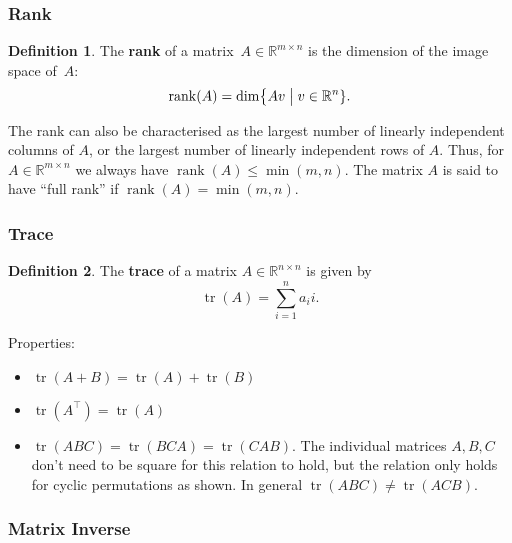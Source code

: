 \documentclass[
  a4paper,
]{article}
\theoremstyle{definition}
\newtheorem{definition}{Definition}[section]
\theoremstyle{definition}
\theoremstyle{definition}
\theoremstyle{definition}
\theoremstyle{remark}
\begin{document}
\hypertarget{rank}{%
\subsubsection{Rank}\label{rank}}

\begin{definition}
The \textbf{rank} of a matrix~\(A \in \mathbb{R}^{m \times n}\) is the dimension of the
image space of~\(A\):
\begin{equation*}
  \mathop{\mathrm{rank}}(A)
  = \dim \bigl\{ Av \bigm| v\in \mathbb{R}^n \}.
\end{equation*}
\end{definition}

The rank can also be characterised as the largest number of linearly
independent columns of \(A\), or the largest number of linearly
independent rows of \(A\). Thus, for \(A \in \mathbb{R}^{m \times n}\) we
always have \(\mathop{\mathrm{rank}}(A) \leq \min(m, n)\). The matrix \(A\)
is said to have ``full rank'' if \(\mathop{\mathrm{rank}}(A) = \min(m, n)\).

\hypertarget{trace}{%
\subsubsection{Trace}\label{trace}}

\begin{definition}
The \textbf{trace} of a matrix \(A \in \mathbb{R}^{n\times n}\) is given by
\begin{equation*}
  \mathop{\mathrm{tr}}(A) = \sum_{i=1}^n a_ii.
\end{equation*}
\end{definition}

Properties:

\begin{itemize}
\item
  \(\mathop{\mathrm{tr}}(A+B) = \mathop{\mathrm{tr}}(A) + \mathop{\mathrm{tr}}(B)\)
\item
  \(\mathop{\mathrm{tr}}(A^\top) = \mathop{\mathrm{tr}}(A)\)
\item
  \(\mathop{\mathrm{tr}}(ABC) = \mathop{\mathrm{tr}}(BCA) = \mathop{\mathrm{tr}}(CAB)\). The individual matrices \(A, B, C\) don't
  need to be square for this relation to hold, but the relation only holds for
  cyclic permutations as shown. In general \(\mathop{\mathrm{tr}}(ABC) \neq \mathop{\mathrm{tr}}(ACB)\).
\end{itemize}

\hypertarget{matrix-inverse}{%
\subsubsection{Matrix Inverse}\label{matrix-inverse}}
\end{document}
